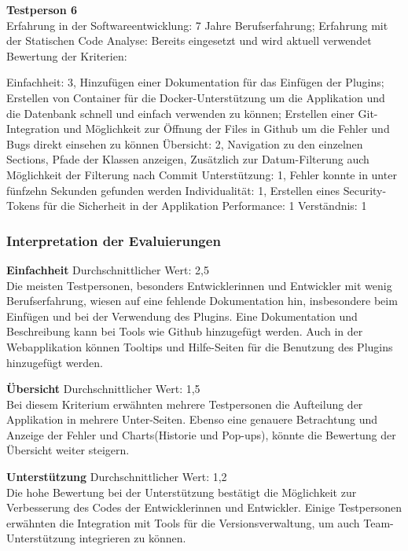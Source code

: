 \textbf{Testperson 6} \\
Erfahrung in der Softwareentwicklung: 7 Jahre Berufserfahrung; Erfahrung mit der Statischen Code Analyse: Bereits eingesetzt und wird aktuell verwendet\\
Bewertung der Kriterien:

Einfachheit: 3, Hinzufügen einer Dokumentation für das Einfügen der Plugins; Erstellen von Container für die Docker-Unterstützung um die Applikation und die Datenbank schnell und einfach verwenden zu können; Erstellen einer Git-Integration und Möglichkeit zur Öffnung der Files in Github um die Fehler und Bugs direkt einsehen zu können \newline Übersicht: 2, Navigation zu den einzelnen Sections, Pfade der Klassen anzeigen, Zusätzlich zur Datum-Filterung auch Möglichkeit der Filterung nach Commit \newline  Unterstützung: 1, Fehler konnte in unter fünfzehn Sekunden gefunden werden \newline Individualität: 1, Erstellen eines Security-Tokens für die Sicherheit in der Applikation \newline Performance: 1 \newline  Verständnis: 1\newline 

\subsubsection{Interpretation der Evaluierungen}
\textbf{Einfachheit}
Durchschnittlicher Wert: 2,5\\
Die meisten Testpersonen, besonders Entwicklerinnen und Entwickler mit wenig Berufserfahrung, wiesen auf eine fehlende Dokumentation hin, insbesondere beim Einfügen und bei der Verwendung des Plugins. Eine Dokumentation und Beschreibung kann bei Tools wie Github hinzugefügt werden. Auch in der Webapplikation können Tooltips und Hilfe-Seiten für die Benutzung des Plugins hinzugefügt werden.

\textbf{Übersicht}
Durchschnittlicher Wert: 1,5\\
Bei diesem Kriterium erwähnten mehrere Testpersonen die Aufteilung der Applikation in mehrere Unter-Seiten. Ebenso eine genauere Betrachtung und Anzeige der Fehler und Charts(Historie und Pop-ups), könnte die Bewertung der Übersicht weiter steigern.

\textbf{Unterstützung}
Durchschnittlicher Wert: 1,2\\
Die hohe Bewertung bei der Unterstützung bestätigt die Möglichkeit zur Verbesserung des Codes der Entwicklerinnen und Entwickler. Einige Testpersonen erwähnten die Integration mit Tools für die Versionsverwaltung, um auch Team-Unterstützung integrieren zu können.

